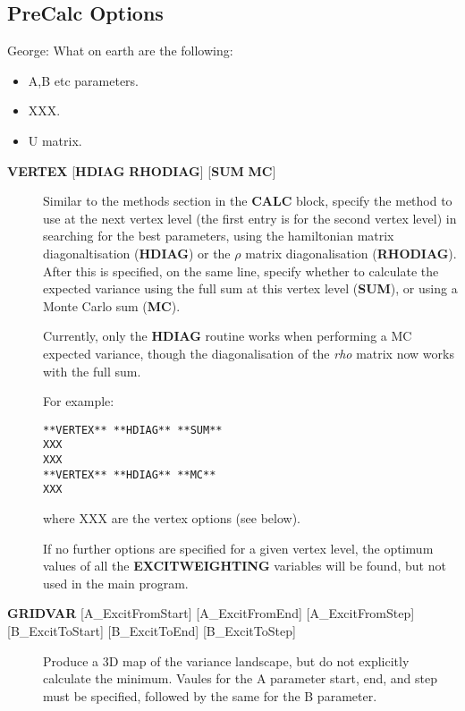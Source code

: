 \documentclass[openany,a4paper,10pt]{manual}
\begin{document}
\subsection{PreCalc Options}

\begin{notice}[note]
George:
What on earth are the following:
\begin{itemize}
\item {} 
A,B etc parameters.

\item {} 
XXX.

\item {} 
U matrix.

\end{itemize}
\end{notice}
\begin{description}
\item[\textbf{VERTEX} {[}\textbf{HDIAG} \textbf{RHODIAG}{]} {[}\textbf{SUM} \textbf{MC}{]}]
Similar to the methods section in the \textbf{CALC} block, specify the
method to use at the next vertex level (the first entry is for the
second vertex level) in searching for the best parameters, using the
hamiltonian matrix diagonaltisation (\textbf{HDIAG}) or the $\rho$
matrix diagonalisation (\textbf{RHODIAG}). After this is specified, on
the same line, specify whether to calculate the expected variance
using the full sum at this vertex level (\textbf{SUM}), or using a Monte
Carlo sum (\textbf{MC}).

Currently, only the \textbf{HDIAG} routine works when performing a MC
expected variance, though the diagonalisation of the \emph{rho} matrix
now works with the full sum.

For example:

\begin{Verbatim}[commandchars=@\[\]]
**VERTEX** **HDIAG** **SUM**
XXX
XXX
**VERTEX** **HDIAG** **MC**
XXX
\end{Verbatim}

where XXX are the vertex options (see below).

If no further options are specified for a given vertex level, the
optimum values of all the \textbf{EXCITWEIGHTING} variables will be found,
but not used in the main program.

\item[\textbf{GRIDVAR} {[}A\_ExcitFromStart{]} {[}A\_ExcitFromEnd{]} {[}A\_ExcitFromStep{]} {[}B\_ExcitToStart{]} {[}B\_ExcitToEnd{]} {[}B\_ExcitToStep{]}]
Produce a 3D map of the variance landscape, but do not explicitly
calculate the minimum. Vaules for the A parameter start, end, and
step must be specified, followed by the same for the B parameter.


\end{description}
\end{document}
